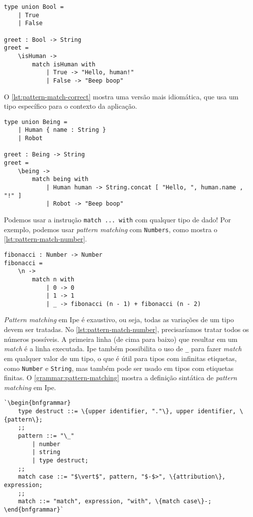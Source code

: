 \begin{lstlisting}[label={lst:pattern-match-if},caption={Substituto de if usando \textit{pattern matching}}]
type union Bool =
    | True
    | False

greet : Bool -> String
greet =
    \isHuman ->
        match isHuman with
            | True -> "Hello, human!"
            | False -> "Beep boop"
\end{lstlisting}

O \autoref{lst:pattern-match-correct} mostra uma versão mais idiomática,
que usa um tipo específico para o contexto da aplicação.

\begin{lstlisting}[label={lst:pattern-match-correct},caption={Maneira idiomática da função greet}]
type union Being =
    | Human { name : String }
    | Robot

greet : Being -> String
greet =
    \being ->
        match being with
            | Human human -> String.concat [ "Hello, ", human.name , "!" ]
            | Robot -> "Beep boop"
\end{lstlisting}

Podemos usar a instrução \texttt{match ... with} com qualquer tipo de dado! Por
exemplo, podemos usar \textit{pattern matching} com \texttt{Numbers}, como mostra
o \autoref{lst:pattern-match-number}.

\begin{lstlisting}[label={lst:pattern-match-number},caption={Pattern matching com números}]
fibonacci : Number -> Number
fibonacci =
    \n ->
        match n with
            | 0 -> 0
            | 1 -> 1
            | _ -> fibonacci (n - 1) + fibonacci (n - 2)
\end{lstlisting}

\textit{Pattern matching} em Ipe é exaustivo, ou seja, todas as variações de um
tipo devem ser tratadas. No \autoref{lst:pattern-match-number}, precisaríamos
tratar todos os números possíveis. A primeira linha (de cima para baixo) que
resultar em um \textit{match} é a linha executada. Ipe também possibilita o uso
de \texttt{\_} para fazer \textit{match} em qualquer valor de um tipo, o que é
útil para tipos com infinitas etiquetas, como \texttt{Number} e \texttt{String},
mas também pode ser usado em tipos com etiquetas finitas. O \autoref{grammar:pattern-matching}
mostra a definição sintática de \textit{pattern matching} em Ipe.

\begin{lstlisting}[label={grammar:pattern-matching},caption={Definição de \textit{pattern matching} em EBNF},escapechar=`,numbers=none]
`\begin{bnfgrammar}
    type destruct ::= \{upper identifier, "."\}, upper identifier, \{pattern\};
    ;;
    pattern ::= "\_"
        | number
        | string
        | type destruct;
    ;;
    match case ::= "$\vert$", pattern, "$-$>", \{attribution\}, expression;
    ;;
    match ::= "match", expression, "with", \{match case\}-;
\end{bnfgrammar}`
\end{lstlisting}


